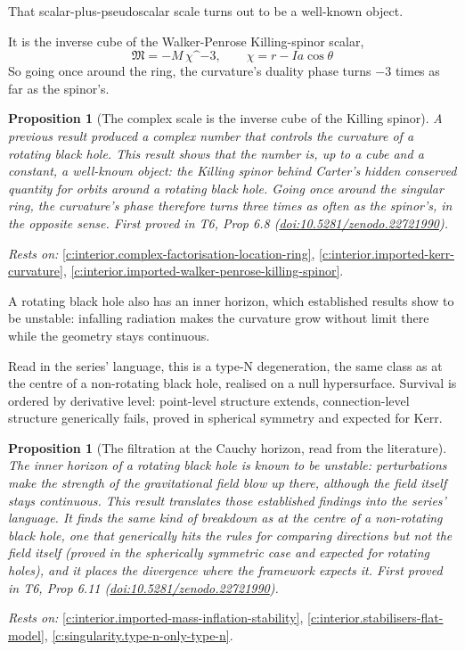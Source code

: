 \documentclass[11pt]{article}
\newtheorem{proposition}[theorem]{Proposition}
\theoremstyle{definition}
\theoremstyle{plain}
\begin{document}
That scalar-plus-pseudoscalar scale turns out to be a well-known object.

It is the inverse cube of the Walker-Penrose Killing-spinor scalar, \[ \mathfrak M = -M\,\chi\^{}{-3}, \qquad \chi = r - Ia\cos\theta \] So going once around the ring, the curvature's duality phase turns $-3$ times as far as the spinor's.

\begin{proposition}[The complex scale is the inverse cube of the Killing spinor]\label{c:interior.complex-scale-inverse-cube-killing-spinor}
A previous result produced a complex number that controls the curvature of a rotating black hole. This result shows that the number is, up to a cube and a constant, a well-known object: the Killing spinor behind Carter's hidden conserved quantity for orbits around a rotating black hole. Going once around the singular ring, the curvature's phase therefore turns three times as often as the spinor's, in the opposite sense.
\emph{First proved in} T6, Prop 6.8 (\href{https://doi.org/10.5281/zenodo.22721990}{doi:10.5281/zenodo.22721990}).
\end{proposition}
\noindent\emph{Rests on:} \ref{c:interior.complex-factorisation-location-ring}, \ref{c:interior.imported-kerr-curvature}, \ref{c:interior.imported-walker-penrose-killing-spinor}.

A rotating black hole also has an inner horizon, which established results show to be unstable: infalling radiation makes the curvature grow without limit there while the geometry stays continuous.

Read in the series' language, this is a type-N degeneration, the same class as at the centre of a non-rotating black hole, realised on a null hypersurface. Survival is ordered by derivative level: point-level structure extends, connection-level structure generically fails, proved in spherical symmetry and expected for Kerr.

\begin{proposition}[The filtration at the Cauchy horizon, read from the literature]\label{c:interior.filtration-cauchy-horizon-read-literature}
The inner horizon of a rotating black hole is known to be unstable: perturbations make the strength of the gravitational field blow up there, although the field itself stays continuous. This result translates those established findings into the series' language. It finds the same kind of breakdown as at the centre of a non-rotating black hole, one that generically hits the rules for comparing directions but not the field itself (proved in the spherically symmetric case and expected for rotating holes), and it places the divergence where the framework expects it.
\emph{First proved in} T6, Prop 6.11 (\href{https://doi.org/10.5281/zenodo.22721990}{doi:10.5281/zenodo.22721990}).
\end{proposition}
\noindent\emph{Rests on:} \ref{c:interior.imported-mass-inflation-stability}, \ref{c:interior.stabilisers-flat-model}, \ref{c:singularity.type-n-only-type-n}.
\end{document}
